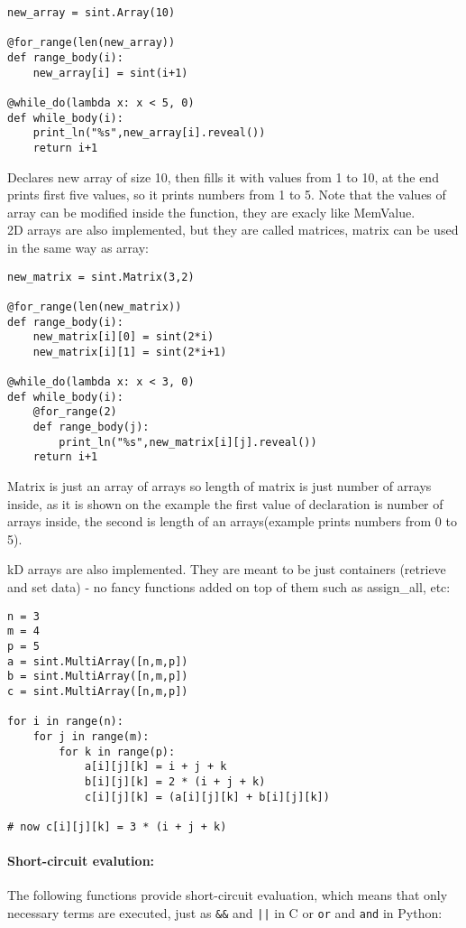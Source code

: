 \begin{lstlisting}
new_array = sint.Array(10)

@for_range(len(new_array))
def range_body(i):
    new_array[i] = sint(i+1)

@while_do(lambda x: x < 5, 0)
def while_body(i):
    print_ln("%s",new_array[i].reveal())
    return i+1
\end{lstlisting}
Declares new array of size 10, then fills it with values from 1 to 10, at the end prints first five values, so it prints numbers from 1 to 5. Note that the values of array can be modified inside the function, they are exacly like MemValue. \\
2D arrays are also implemented, but they are called matrices, matrix can be used in the same way as array:
\begin{lstlisting}
new_matrix = sint.Matrix(3,2)

@for_range(len(new_matrix))
def range_body(i):
    new_matrix[i][0] = sint(2*i)
    new_matrix[i][1] = sint(2*i+1)

@while_do(lambda x: x < 3, 0)
def while_body(i):
    @for_range(2)
    def range_body(j):
        print_ln("%s",new_matrix[i][j].reveal())
    return i+1
\end{lstlisting}
Matrix is just an array of arrays so length of matrix is just number of arrays inside, as it is shown on the example the first value of declaration is number of arrays inside, the second is length of an arrays(example prints numbers from 0 to 5).

kD arrays are also implemented. They are meant to be just containers (retrieve and set data) - no fancy functions added on top of them such as assign_all, etc:

\begin{lstlisting}
n = 3
m = 4
p = 5
a = sint.MultiArray([n,m,p])
b = sint.MultiArray([n,m,p])
c = sint.MultiArray([n,m,p])

for i in range(n):
	for j in range(m):
		for k in range(p):
			a[i][j][k] = i + j + k
			b[i][j][k] = 2 * (i + j + k)
			c[i][j][k] = (a[i][j][k] + b[i][j][k])

# now c[i][j][k] = 3 * (i + j + k)
\end{lstlisting}


\paragraph{Short-circuit evalution:}
The following functions provide short-circuit evaluation, which means
that only necessary terms are executed, just as \verb+&&+ and
\verb+||+ in C or \verb+or+ and \verb+and+ in Python:

